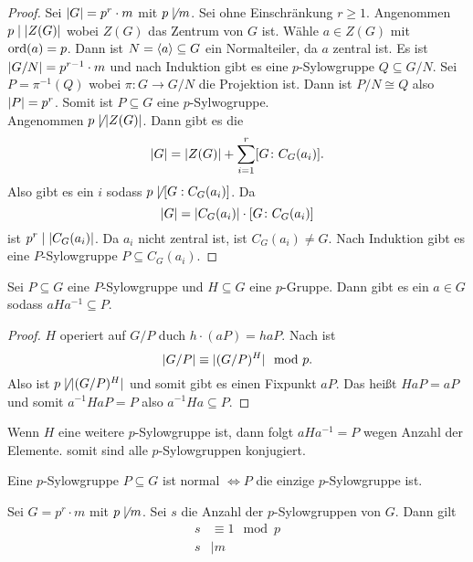 \begin{proof}
    Sei \(\lvert G\rvert=p^r\cdot m\) mit \(p\not\mid m\).
    Sei ohne Einschränkung \(r\geq 1\).
    Angenommen \(p\mid \lvert Z(G)\rvert\) wobei \(Z(G)\) das Zentrum von \(G\) ist. Wähle \(a\in Z(G)\) mit \(\operatorname{ord}(a)=p\). Dann ist \(N=\langle a\rangle\subseteq G\) ein Normalteiler, da \(a\) zentral ist. Es ist \(\lvert G/N\rvert=p^{r-1}\cdot m\) und nach Induktion gibt es eine \(p\)-Sylowgruppe \(Q\subseteq G/N\). Sei \(P=\pi^{-1}(Q)\) wobei \(\pi\colon G\to G/N\) die Projektion ist.
    Dann ist \(P/N\cong Q\) also \(\lvert P\rvert=p^r\). Somit ist \(P\subseteq G\) eine \(p\)-Sylwogruppe.\\
    Angenommen \(p\not\mid \lvert Z(G)\rvert\). Dann gibt es die 
    \[\lvert G\rvert=\lvert Z(G)\rvert+\sum_{i=1}^r[G\colon C_G(a_i)].\]
    Also gibt es ein \(i\) sodass \(p\not\mid [G:C_G(a_i)]\).
    Da \[\lvert G\rvert=\lvert C_G(a_i)\rvert\cdot [G\colon C_G(a_i)]\] ist \(p^r\mid\lvert C_G(a_i)\rvert\). Da \(a_i\) nicht zentral ist, ist \(C_G(a_i)\neq G\). Nach Induktion gibt es eine \(P\)-Sylowgruppe \(P\subseteq C_G(a_i)\).
\end{proof} 
\begin{Satz}[2. Sylowsatz]\label{Satz:2Sylow}
Sei \(P\subseteq G\) eine \(P\)-Sylowgruppe und \(H\subseteq G\) eine \(p\)-Gruppe. Dann gibt es ein \(a\in G\) sodass \(aHa^{-1}\subseteq P\).    
\end{Satz}
\begin{proof}
    \(H\) operiert auf \(G/P\) duch \(h\cdot (aP)=haP\). Nach  ist 
    \[\lvert G/P\rvert\equiv \lvert(G/P)^H\rvert\mod p.\]
    Also ist \(p\not\mid \lvert(G/P)^H\rvert\) und somit gibt es einen Fixpunkt \(aP\). Das heißt \(HaP=aP\) und somit \(a^{-1}HaP=P\) also \(a^{-1}Ha\subseteq P\).
\end{proof}
\begin{Kor}
    Wenn \(H\) eine weitere \(p\)-Sylowgruppe ist, dann folgt \(aHa^{-1}=P\) wegen Anzahl der Elemente. somit sind alle \(p\)-Sylowgruppen konjugiert.
\end{Kor}
\begin{Bem}
    Eine \(p\)-Sylowgruppe \(P\subseteq G\) ist normal \(\iff P\) die einzige \(p\)-Sylowgruppe ist.
\end{Bem}
\begin{Satz}[3. Sylowsatz]\label{Satz:3Sylow}
    Sei \(G=p^r\cdot m\) mit \(p\not \mid m\). Sei \(s\) die Anzahl der \(p\)-Sylowgruppen von \(G\). Dann gilt
    \begin{align}
        s&\equiv 1\mod p\\
        s&\mid m
    \end{align}
\end{Satz}
